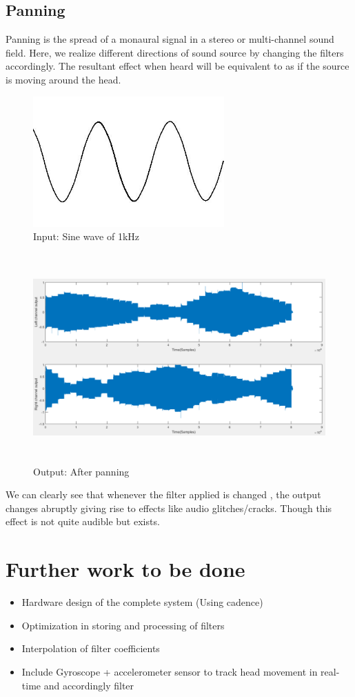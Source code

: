 \documentclass[BTech]{nitkdiss}
\begin{document}
\subsection{Panning}
Panning is the spread of a monaural signal in a stereo or multi-channel sound field. Here, we realize different directions of sound source by changing the filters accordingly. The resultant effect when heard will be equivalent to as if the source is moving around the head. 
\begin{figure}[h!]
\includegraphics[width = \textwidth, height = 5cm]{sine}
\caption{Input: Sine wave of 1kHz}
\end{figure}
\begin{figure}[h!]
\includegraphics[width = \textwidth, height = 8cm]{output_sine}
\caption{Output: After panning}
\end{figure}
We can clearly see that whenever the filter applied is changed , the output changes abruptly giving rise to effects like audio glitches/cracks. Though this effect is not quite audible but exists.  

\section{Further work to be done}
\begin{itemize}
\item Hardware design of the complete system (Using cadence)
\item Optimization in storing and processing of filters
\item Interpolation of filter coefficients 
\item Include Gyroscope + accelerometer sensor to track head movement in real-time and accordingly filter

\end{itemize}

\begin{bibliography}{9}

\end{bibliography}
\end{document}

